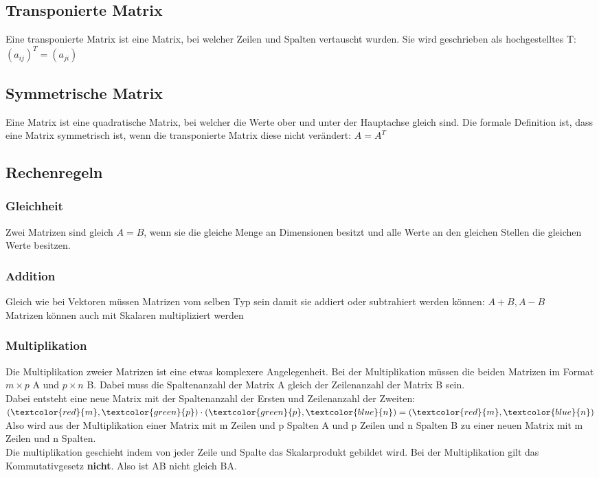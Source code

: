 \documentclass{article}
\begin{document}
	\subsection{Transponierte Matrix}
	Eine transponierte Matrix ist eine Matrix, bei welcher Zeilen und Spalten vertauscht wurden. Sie wird geschrieben als hochgestelltes T: $(a_{ij})^T=(a_{ji})$
	\subsection{Symmetrische Matrix}
	Eine Matrix ist eine quadratische Matrix, bei welcher die Werte ober und unter der Hauptachse gleich sind. Die formale Definition ist, dass eine Matrix symmetrisch ist, wenn die transponierte Matrix diese nicht verändert: $A=A^T$
	\subsection{Rechenregeln}
	\subsubsection{Gleichheit}
	Zwei Matrizen sind gleich $A=B$, wenn sie die gleiche Menge an Dimensionen besitzt und alle Werte an den gleichen Stellen die gleichen Werte besitzen.
	\subsubsection{Addition}
	Gleich wie bei Vektoren müssen Matrizen vom selben Typ sein damit sie addiert oder subtrahiert werden können: $A+B, A-B$ \\
	Matrizen können auch mit Skalaren multipliziert werden
	\subsubsection{Multiplikation}
	Die Multiplikation zweier Matrizen ist eine etwas komplexere Angelegenheit. Bei der Multiplikation müssen die beiden Matrizen im Format $m\times p$ A und $p\times n$ B. Dabei muss die Spaltenanzahl der Matrix A gleich der Zeilenanzahl der Matrix B sein. \\
	Dabei entsteht eine neue Matrix mit der Spaltenanzahl der Ersten und Zeilenanzahl der Zweiten: $(\textcolor{red}{m},\textcolor{green}{p})\cdot(\textcolor{green}{p},\textcolor{blue}{n})=(\textcolor{red}{m},\textcolor{blue}{n})$ \\
	Also wird aus der Multiplikation einer Matrix mit m Zeilen und p Spalten A und p Zeilen und n Spalten B zu einer neuen Matrix mit m Zeilen und n Spalten. \\
	Die multiplikation geschieht indem von jeder Zeile und Spalte das Skalarprodukt gebildet wird. Bei der Multiplikation gilt das Kommutativgesetz \textbf{nicht}. Also ist AB nicht gleich BA.
\end{document}
